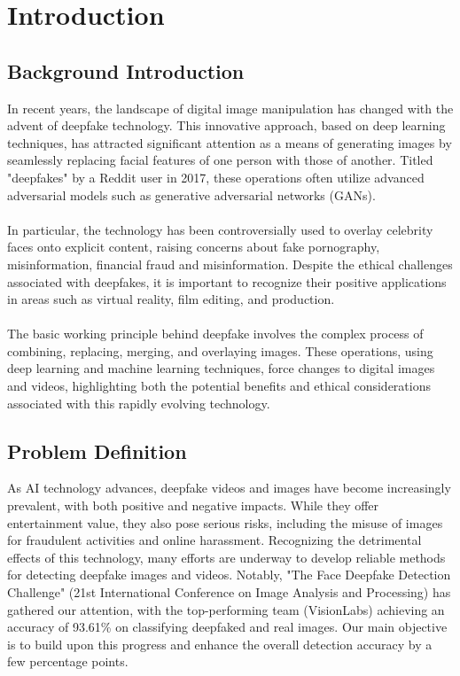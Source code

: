 \chapter{Introduction}
    \section{Background Introduction}
        In recent years, the landscape of digital image manipulation has changed with the advent of deepfake technology.
        This innovative approach, based on deep learning techniques, has attracted significant attention as a means of generating images by seamlessly replacing facial features of one person with those of another.
        Titled "deepfakes" by a Reddit user in 2017, these operations often utilize advanced adversarial models such as generative adversarial networks (GANs). \cite{st2022deep} \\\\
        In particular, the technology has been controversially used to overlay celebrity faces onto explicit content, raising concerns about fake pornography, misinformation, financial fraud and misinformation.
        Despite the ethical challenges associated with deepfakes, it is important to recognize their positive applications in areas such as virtual reality, film editing, and production. \\\\
        The basic working principle behind deepfake involves the complex process of combining, replacing, merging,  and overlaying images.
        These operations, using deep learning and machine learning techniques, force changes to digital images and videos, highlighting both the potential benefits and ethical considerations associated with this rapidly evolving technology.


    \section{Problem Definition}
        As AI technology advances, deepfake videos and images have become increasingly prevalent, with both positive and negative impacts. While they offer entertainment value, they also pose serious risks, including the misuse of images for fraudulent activities and online harassment. Recognizing the detrimental effects of this technology, many efforts are underway to develop reliable methods for detecting deepfake images and videos. Notably, "The Face Deepfake Detection Challenge" (21st International Conference on Image Analysis and Processing) \cite{jimaging8100263} has gathered our attention, with the top-performing team (VisionLabs) achieving an accuracy of 93.61\% on classifying deepfaked and real images. Our main objective is to build upon this progress and enhance the overall detection accuracy by a few percentage points.

